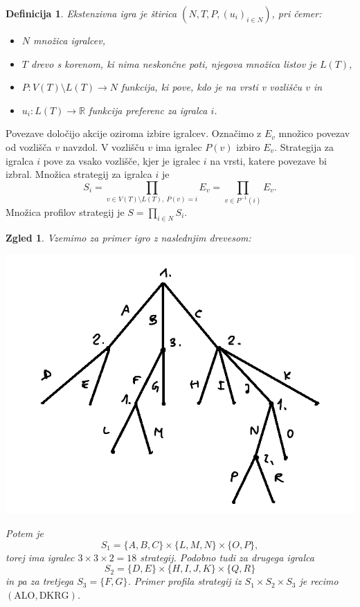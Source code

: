 \documentclass[10pt, a4paper]{article}
\newtheorem{defi}[izr]{Definicija}
\newenvironment{noticeB}{%
  \tcolorbox[%
  notitle,
  empty,
  enhanced,  %
  breakable,
  coltext=black,
  colback=white, 
  fontupper=\rmfamily,
  parbox=false,
  noparskip,
  sharp corners,
  boxrule=-1pt,  %
  frame hidden,
  left=7pt,  %
  right=7pt,
  top=5pt,
  bottom=5pt,
  before skip=2.5ex plus 2pt,
  after skip=2.5ex plus 2pt,
  borderline west = {1.5pt}{-0.1pt}{blue!30!black}, %
  overlay unbroken and last={%
    \draw[color=black, line width=1.25pt]
    ($(frame.south west)+(1.pt, -0.1pt)$) -- ++(2em, 0);
  }
  ]}
{\endtcolorbox}
\newenvironment{definicija}{\begin{defi}\begin{noticeB}}{%
    \end{noticeB}\end{defi}}
\newtheorem{zgled}[izr]{Zgled}
\newcommand{\R}{\mathbb {R}}
\begin{document}
\begin{definicija}
  Ekstenzivna igra je štirica $(N, T, P, (u_i)_{i \in N})$, pri čemer:
  \begin{itemize}
    \item $N$ množica igralcev,
    \item $T$ drevo s korenom, ki nima neskončne poti, njegova množica listov je $L(T)$,
    \item $P: V(T) \setminus L(T) \to N$ funkcija, ki pove, kdo je na vrsti v vozlišču $v$ in 
    \item $u_i: L(T) \to \R$ funkcija preferenc za igralca $i$.
  \end{itemize}
\end{definicija}

Povezave določijo akcije oziroma izbire igralcev. Označimo z $E_v$ množico povezav od vozlišča $v$ navzdol.
V vozlišču $v$ ima igralec $P(v)$ izbiro $E_v$. Strategija za igralca $i$ pove za vsako vozlišče, kjer je igralec $i$ na vrsti,
katere povezave bi izbral. Množica strategij za igralca $i$ je 
$$S_i = \prod_{v \in V(T) \setminus L(T),\ P(v) = i} E_v = \prod_{v \in P^{-1} (i)} E_v.$$
Množica profilov strategij je $S = \prod_{i \in N} S_i$.

\begin{zgled}
  Vzemimo za primer igro z naslednjim drevesom:
  \begin{center}
    \includegraphics[scale=0.6]{drevo_3.png}
  \end{center}
  Potem je 
  $$S_1 = \{A, B, C\} \times \{L, M, N\} \times \{O, P\},$$
  torej ima igralec $3 \times 3 \times 2 = 18$ strategij. Podobno tudi za drugega igralca
  $$S_2 = \{D, E\} \times \{H, I, J, K\} \times \{Q, R\}$$ in pa za tretjega $S_3 = \{F, G\}$.
  Primer profila strategij iz $S_1 \times S_2 \times S_3$ je recimo $(\text{ALO}, \text{DKRG})$.
\end{zgled}
\end{document}
